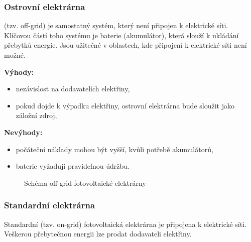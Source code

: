 \subsubsection{Ostrovní elektrárna}

(tzv. off-grid) je samostatný systém, který není připojen k elektrické síti.
Klíčovou částí toho systému je baterie (akumulátor), která slouží k ukládání přebytků energie.
Jsou užitečné v oblastech, kde připojení k elektrické síti není možné.

\begin{multicols}{2}
    \textbf{Výhody:}
    \begin{itemize}[leftmargin=*]
        \item nezávislost na dodavatelích elektřiny,
        \item pokud dojde k výpadku elektřiny, ostrovní elektrárna bude sloužit jako záložní zdroj,
    \end{itemize}
    
    \columnbreak
    
    \textbf{Nevýhody:}
    \begin{itemize}[leftmargin=*]
        \item počáteční náklady mohou být vyšší, kvůli potřebě akumulátorů,
        \item baterie vyžadují pravidelnou údržbu.
    \end{itemize}
\end{multicols}

\begin{figure}[h]
    \centering
    \caption{Schéma off-grid fotovoltaické elektrárny}
    \label{fig:offgrid_schema}
\end{figure}

\subsubsection{Standardní elektrárna}

Standardní (tzv. on-grid) fotovoltaická elektrárna je připojena k elektrické síti.
Veškerou přebytečnou energii lze prodat dodavateli elektřiny.


